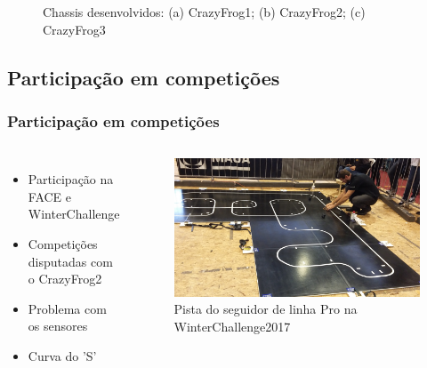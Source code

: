 \begin{frame}
\begin{figure}[h]
\begin{subfigure}[b]{0.3\textwidth}
         \caption{\centering}
     \end{subfigure}
     \caption{Chassis desenvolvidos: (a) CrazyFrog1; (b) CrazyFrog2; (c) CrazyFrog3}

 \end{figure}
\end{frame}



\subsection{Participação em competições}

\begin{frame}
\frametitle{Participação em competições}
\begin{columns}

	\begin{itemize}
		\item Participação na FACE e WinterChallenge
		\item Competições disputadas com o CrazyFrog2
		\item Problema com os sensores
		\item Curva do 'S'
	\end{itemize}		
	
	
	\begin{figure}[th]
	\centering
	\captionsetup{width=\textwidth,font=footnotesize,textfont=bf}
	\includegraphics[width=\textwidth,keepaspectratio]{Figuras/winter.jpg}
	\caption{Pista do seguidor de linha Pro na WinterChallenge2017}
	\end{figure}
	
\end{columns}
\end{frame}

